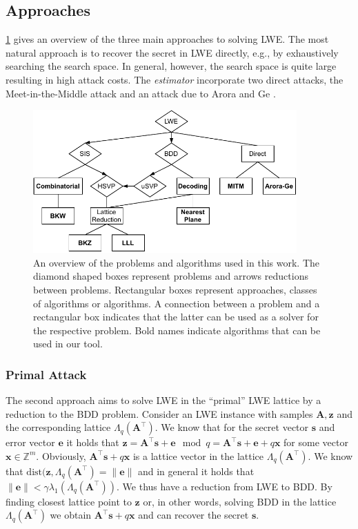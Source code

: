 \subsection{Approaches}
\cref{fig:algorithms} gives an overview of the three main approaches to solving LWE. The most natural approach is to recover the secret in LWE directly, e.g., by exhaustively searching the search space. In general, however, the search space is quite large resulting in high attack costs. The \textit{estimator} incorporate two direct attacks, the Meet-in-the-Middle attack \cite{BG14} and an attack due to Arora and Ge \cite{AG11}. %
\begin{figure}[h]
  \centering
  \includegraphics[width=0.9\textwidth]{graphics/algorithms_overview.pdf}
  \caption{An overview of the problems and algorithms used in this work. The diamond shaped boxes represent problems and arrows reductions between problems. Rectangular boxes represent approaches, classes of algorithms or algorithms. A connection between a problem and a rectangular box indicates that the latter can be used as a solver for the respective problem. Bold names indicate algorithms that can be used in our tool.}\label{fig:algorithms}
\end{figure}

\subsubsection{Primal Attack}\label{sec:primal-attacks}
The second approach aims to solve LWE in the ``primal'' LWE lattice by a reduction to the BDD problem. Consider an LWE instance with samples $\mathbf{A}, \mathbf{z}$ and the corresponding lattice $\Lambda_q(\mathbf{A}^\intercal)$. We know that for the secret vector $\mathbf{s}$ and error vector $\mathbf{e}$ it holds that $\mathbf{z} = \mathbf{A}^\intercal \mathbf{s} + \mathbf{e} \mod q = \mathbf{A}^\intercal \mathbf{s} + \mathbf{e} + q \mathbf{x}$ for some vector $\mathbf{x} \in \mathbb{Z}^m$. Obviously, $\mathbf{A}^\intercal \mathbf{s} + q \mathbf{x}$ is a lattice vector in the lattice $\Lambda_q(\mathbf{A}^\intercal)$. We know that $\text{dist}(\mathbf{z}, \Lambda_q(\mathbf{A}^\intercal) = \|\mathbf{e}\|$ and in general it holds that $\|\mathbf{e}\| < \gamma \lambda_1(\Lambda_q(\mathbf{A}^\intercal))$. We thus have a reduction from LWE to BDD. By finding closest lattice point to $\mathbf{z}$ or, in other words, solving BDD in the lattice $\Lambda_q(\mathbf{A}^\intercal)$ we obtain $\mathbf{A}^\intercal \mathbf{s} + q \mathbf{x}$  and can recover the secret $\mathbf{s}$.

